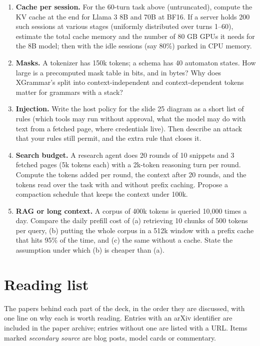 \documentclass[11pt,letterpaper]{article}
\begin{document}
\begin{enumerate}[leftmargin=1.6em,itemsep=6pt]
\item \textbf{Cache per session.} For the 60-turn task above (untruncated), compute the KV cache at the end for Llama 3 8B and 70B at BF16. If a server holds 200 such sessions at various stages (uniformly distributed over turns 1--60), estimate the total cache memory and the number of 80 GB GPUs it needs for the 8B model; then with the idle sessions (say 80\%) parked in CPU memory.
\item \textbf{Masks.} A tokenizer has 150k tokens; a schema has 40 automaton states. How large is a precomputed mask table in bits, and in bytes? Why does XGrammar's split into context-independent and context-dependent tokens matter for grammars with a stack?
\item \textbf{Injection.} Write the host policy for the slide 25 diagram as a short list of rules (which tools may run without approval, what the model may do with text from a fetched page, where credentials live). Then describe an attack that your rules still permit, and the extra rule that closes it.
\item \textbf{Search budget.} A research agent does 20 rounds of 10 snippets and 3 fetched pages (5k tokens each) with a 2k-token reasoning turn per round. Compute the tokens added per round, the context after 20 rounds, and the tokens read over the task with and without prefix caching. Propose a compaction schedule that keeps the context under 100k.
\item \textbf{RAG or long context.} A corpus of 400k tokens is queried 10,000 times a day. Compare the daily prefill cost of (a) retrieving 10 chunks of 500 tokens per query, (b) putting the whole corpus in a 512k window with a prefix cache that hits 95\% of the time, and (c) the same without a cache. State the assumption under which (b) is cheaper than (a).
\end{enumerate}
\clearpage
\section{Reading list}
\label{app:reading}
The papers behind each part of the deck, in the order they are discussed, with one line on why each is worth reading. Entries with an arXiv identifier are included in the paper archive; entries without one are listed with a URL. Items marked \emph{secondary source} are blog posts, model cards or commentary.
\end{document}
